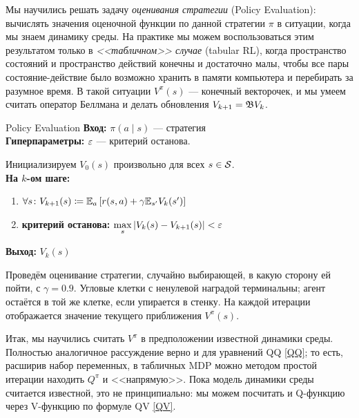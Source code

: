 Мы научились решать задачу \emph{оценивания стратегии} (Policy Evaluation): вычислять значения оценочной функции по данной стратегии $\pi$ в ситуации, когда мы знаем динамику среды. На практике мы можем воспользоваться этим результатом только в \emph{<<табличном>> случае} (tabular RL), когда пространство состояний и пространство действий конечны и достаточно малы, чтобы все пары состояние-действие было возможно хранить в памяти компьютера и перебирать за разумное время. В такой ситуации $V^\pi(s)$ --- конечный векторочек, и мы умеем считать оператор Беллмана и делать обновления $V_{k+1} = \mathfrak{B} V_k$.

\begin{algorithm}[label=policyevaluation]{Policy Evaluation}
\textbf{Вход:} $\pi(a \mid s)$ --- стратегия \\
\textbf{Гиперпараметры:} $\varepsilon$ --- критерий останова.

\vspace{0.3cm}
Инициализируем $V_0(s)$ произвольно для всех $s \in \mathcal{S}$. \\
\textbf{На $k$-ом шаге:}
\begin{enumerate}
    \item $\forall s \colon V_{k+1}(s) \coloneqq \mathbb{E}_{a} \left[ r(s, a) + \gamma \mathbb{E}_{s'} V_k(s')\right]$
    \item \textbf{критерий останова:} $\max\limits_s |V_k(s) - V_{k+1}(s)| < \varepsilon$
\end{enumerate}

\vspace{0.3cm}
\textbf{Выход:} $V_k(s)$
\end{algorithm}

\begin{exampleBox}[label=ex:pe, righthand ratio=0.3, sidebyside, sidebyside align=center, lower separated=false]{}
Проведём оценивание стратегии, случайно выбирающей, в какую сторону ей пойти, с $\gamma = 0.9$. Угловые клетки с ненулевой наградой терминальны; агент остаётся в той же клетке, если упирается в стенку. На каждой итерации отображается значение текущего приближения $V^{\pi}(s)$.

\tcblower
\end{exampleBox}

Итак, мы научились считать $V^\pi$ в предположении известной динамики среды. Полностью аналогичное рассуждение верно и для уравнений QQ \eqref{QQ}; то есть, расширив набор переменных, в табличных MDP можно методом простой итерации находить $Q^{\pi}$ и <<напрямую>>. Пока модель динамики среды считается известной, это не принципиально: мы можем посчитать и Q-функцию через V-функцию по формуле QV \eqref{QV}.


